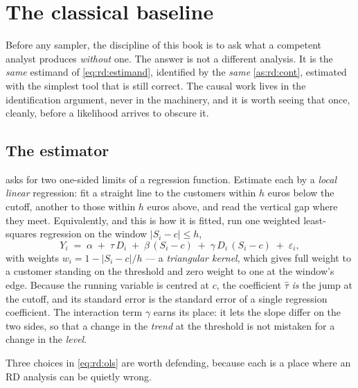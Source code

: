 \section{The classical baseline}
\label{sec:rd:classical}

Before any sampler, the discipline of this book is to ask what a competent analyst produces
\emph{without} one. The answer is not a different analysis. It is the \emph{same} estimand of
\cref{eq:rd:estimand}, identified by the \emph{same} \cref{as:rd:cont}, estimated with the simplest
tool that is still correct. The causal work lives in the identification argument, never in the
machinery, and it is worth seeing that once, cleanly, before a likelihood arrives to obscure it.

\subsection*{The estimator}

 asks for two one-sided limits of a regression function. Estimate each by a
\emph{local linear} regression: fit a straight line to the customers within $h$ euros below the
cutoff, another to those within $h$ euros above, and read the vertical gap where they meet.
Equivalently, and this is how it is fitted, run one weighted least-squares regression on the window
$|S_i - c| \le h$,
%
\begin{equation}
  Y_i \;=\; \alpha \;+\; \tau\, D_i \;+\; \beta\,(S_i - c) \;+\; \gamma\, D_i \,(S_i - c)
            \;+\; \varepsilon_i ,
  \label{eq:rd:ols}
\end{equation}
%
with weights $w_i = 1 - |S_i - c| / h$ --- a \emph{triangular kernel}, which gives full weight to a
customer standing on the threshold and zero weight to one at the window's edge. Because the running
variable is centred at $c$, the coefficient $\hat\tau$ \emph{is} the jump at the cutoff, and its
standard error is the standard error of a single regression coefficient. The interaction term
$\gamma$ earns its place: it lets the slope differ on the two sides, so that a change in the
\emph{trend} at the threshold is not mistaken for a change in the \emph{level}.

Three choices in \cref{eq:rd:ols} are worth defending, because each is a place where an RD analysis
can be quietly wrong.

